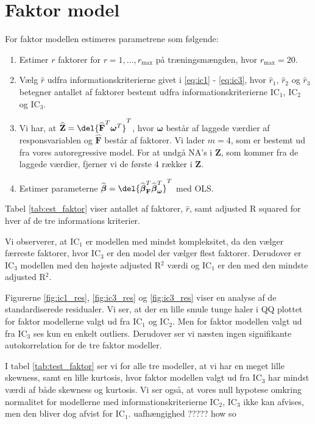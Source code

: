 \clearpage
\section{Faktor model}
For faktor modellen estimeres parametrene som følgende:
\begin{enumerate}
\item Estimer $r$ faktorer for $r = 1, \dots, r_{\max}$ på træningsmængden, hvor $r_{\max} = 20$.  
\item Vælg $\widehat{r}$ udfra informationskriterierne givet i \eqref{eq:ic1} -  \eqref{eq:ic3}, hvor $\widehat{r}_1$, $\widehat{r}_2$ og $\widehat{r}_3$ betegner antallet af faktorer bestemt udfra informationskriterierne IC$_1$, IC$_2$ og IC$_3$.
\item Vi har, at $\widehat{\textbf{Z}} = \del{\widehat{{\textbf{F}}}^T\boldsymbol{\omega}^T}^T$, hvor $ \boldsymbol{\omega}$ består af laggede værdier af responsvariablen og $\widehat{\textbf{F}}$ består af faktorer. Vi lader $m = 4$, som er bestemt ud fra vores autoregressive model. For at undgå NA's i $\textbf{Z}$, som kommer fra de laggede værdier, fjerner vi de første 4 rækker i $\textbf{Z}$. 
\item Estimer parameterne $\widehat{\boldsymbol{\beta}} = \del{ \widehat{\boldsymbol{\beta}}^T_{\textbf{F}} \widehat{\boldsymbol{\beta}}^T_{\boldsymbol{\omega}}}^T$ med OLS.
\end{enumerate}

Tabel \ref{tab:est_faktor} viser antallet af faktorer, $\widehat{r}$, samt adjusted R squared for hver af de tre informations kriterier. 


Vi observerer, at IC$_1$ er modellen med mindst kompleksitet, da den vælger færreste faktorer, hvor IC$_3$ er den model der vælger flest faktorer. Derudover er IC$_3$ modellen med den højeste adjusted R$^2$ værdi og IC$_1$ er den med den mindste adjusted R$^2$.

Figurerne \ref{fig:ic1_res}, \ref{fig:ic3_res} og \ref{fig:ic3_res} viser en analyse af de standardiserede residualer. Vi ser, at der en lille smule tunge haler i QQ plottet for faktor modellerne valgt ud fra IC$_1$ og IC$_2$. Men for faktor modellen valgt ud fra IC$_3$ ses kun en enkelt outliers. 
Derudover ser vi næsten ingen signifikante autokorrelation for de tre faktor modeller. 



I tabel  \ref{tab:test_faktor} ser vi for alle tre modeller, at vi har en meget lille skewness, samt en lille kurtosis, hvor faktor modellen valgt ud fra IC$_3$ har mindst værdi af både skewness og kurtosis. 
Vi ser også, at vores null hypotese omkring normalitet for modellerne med informationskriterierne IC$_2$, IC$_3$ ikke kan afvises, men den bliver dog afvist for IC$_1$. uafhængighed ????? how so 
 

